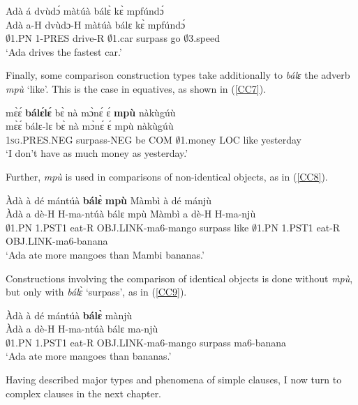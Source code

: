 \begin{exe} 
\ex\label{CC5}
  \glll Adà á dvùdɔ́ màtúà bálɛ̀ kɛ̀ mpfúndɔ́ \\
        Adà a-H dvùdɔ-H màtúà bálɛ kɛ̀ mpfúndɔ́ \\
       $\emptyset$1.PN 1-PRES drive-R $\emptyset$1.car surpass go $\emptyset$3.speed  \\
    \trans `Ada drives the fastest car.'
\end{exe}


Finally, some comparison construction types take additionally to {\itshape bálɛ} the adverb {\itshape mpù} `like'. This is the case in equatives, as shown in (\ref{CC7}).

\begin{exe} 
\ex\label{CC7}
  \glll mɛ̀ɛ́ {\bfseries bálɛ́lɛ́} bɛ̀ nà mɔ̀nɛ́ ɛ́ {\bfseries mpù} nàkùgúù \\
        mɛ̀ɛ́ bálɛ-lɛ bɛ̀ nà mɔ̀nɛ́ ɛ́ mpù nàkùgúù \\
       1\textsc{sg}.PRES.NEG surpass-NEG be COM $\emptyset$1.money LOC like yesterday \\
    \trans `I don't have as much money as yesterday.'
\end{exe}

\noindent Further, {\itshape mpù} is used in comparisons of non-identical objects, as in (\ref{CC8}).

\begin{exe} 
\ex\label{CC8}
  \glll Àdà à dé mántúà {\bfseries bálɛ̀} {\bfseries mpù} Màmbì à dé mánjù \\
        Àdà a dè-H H-ma-ntúà bálɛ mpù Màmbì a dè-H H-ma-njù \\
       $\emptyset$1.PN 1.PST1 eat-R OBJ.LINK-ma6-mango surpass like $\emptyset$1.PN 1.PST1 eat-R OBJ.LINK-ma6-banana \\
    \trans `Ada ate more mangoes than Mambi bananas.'
\end{exe}

Constructions involving the comparison of identical objects is done without {\itshape mpù}, but only with {\itshape bálɛ̀} `surpass', as in (\ref{CC9}).

\begin{exe} 
\ex\label{CC9}
  \glll Àdà à dé mántúà {\bfseries bálɛ̀} mànjù \\
        Àdà a dè-H H-ma-ntúà bálɛ ma-njù \\
       $\emptyset$1.PN 1.PST1 eat-R OBJ.LINK-ma6-mango surpass ma6-banana \\
    \trans `Ada ate more mangoes than bananas.'
\end{exe}

\noindent Having described major types and phenomena of simple clauses, I now turn to complex clauses in the next chapter. 







